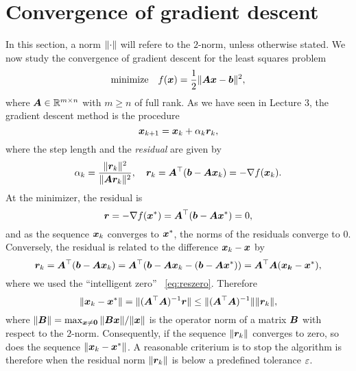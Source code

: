 \section{Convergence of gradient descent}
In this section, a norm $\Vert {\cdot}\Vert$ will refere to the $2$-norm, unless otherwise stated.
We now study the convergence of gradient descent for the least squares problem
\begin{equation}\label{eq:ffromgraddesc}
 \text{minimize}\quad f(\bm{x}) = \frac{1}{2}\Vert {\bm{A}\bm{x}-\bm{b}}\Vert^2,
\end{equation}
where $\bm{A}\in \mathbb{R}^{m\times n}$ with $m\geq n$ of full rank.
As we have seen in Lecture 3, the gradient descent method is the procedure
\begin{equation*}
 \bm{x}_{k+1}=\bm{x}_{k} + \alpha_k\bm{r}_k,
\end{equation*}
where the step length and the {\em residual} are given by
\begin{equation*}
 \alpha_k = \frac{\Vert {\bm{r}_k}\Vert^2}{\Vert {\bm{A}\bm{r}_k}\Vert^2}, \quad \bm{r}_k = \bm{A}^{\top}(\bm{b}-\bm{A}\bm{x}_k)=-\nabla f(\bm{x}_k).
\end{equation*}
At the minimizer, the residual is 
\begin{equation}\label{eq:reszero}
 \bm{r} = -\nabla f(\bm{x}^*)=\bm{A}^{\top}(\bm{b}-\bm{A}\bm{x}^*) = 0,
\end{equation}
and 
as the sequence $\bm{x}_k$ converges to $\bm{x}^*$, the norms of the residuals converge to $0$. Conversely, the residual is related to the difference $\bm{x}_k-\bm{x}$ by
\begin{equation}\label{eq:resdif}
 \bm{r}_k = \bm{A}^{\top}(\bm{b}-\bm{A}\bm{x}_k) = \bm{A}^{\top}(\bm{b}-\bm{A}\bm{x}_k-(\bm{b}-\bm{A}\bm{x}^*)) = \bm{A}^{\top}\bm{A}(\bm{x_k}-\bm{x}^*),
\end{equation}
where we used the ``intelligent zero'' ~\eqref{eq:reszero}. Therefore
\begin{equation*}
 \Vert {\bm{x}_k-\bm{x}^*}\Vert = \Vert {(\bm{A}^{\top}\bm{A})^{-1}\bm{r}}\Vert\leq \Vert {(\bm{A}^{\top}\bm{A})^{-1}}\Vert\Vert {\bm{r}_k}\Vert,
\end{equation*}
where $\Vert {\bm{B}}\Vert = \max_{\bm{x}\neq \bm{0}}\Vert {\bm{B}\bm{x}}\Vert/\Vert {\bm{x}}\Vert$ is the operator norm of a matrix $\bm{B}$ with respect to the $2$-norm. Consequently, if the sequence $\Vert {\bm{r}_k}\Vert$ converges to zero, so does the sequence $\Vert {\bm{x}_k-\bm{x}^*}\Vert$. A reasonable criterium is to stop the algorithm is therefore when the residual norm $\Vert {\bm{r}_k}\Vert$ is below a predefined tolerance $\varepsilon$. 

